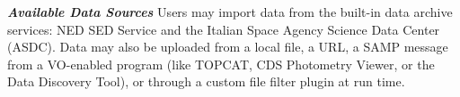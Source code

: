 \textit{\textbf{\label{fig:data_sources} Available Data Sources}}\textit{}\textbf{}\textit{} Users may import data from the built-in data archive services: NED SED Service and the Italian Space Agency Science Data Center (ASDC). Data may also be uploaded from a local file, a URL, a SAMP message from a VO-enabled program (like TOPCAT, CDS Photometry Viewer, or the Data Discovery Tool), or through a custom file filter plugin at run time.